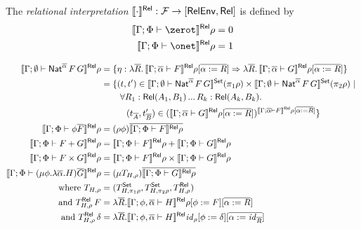 \documentclass{lmcs}
\theoremstyle{plain}\newtheorem{satz}[thm]{Satz}
\newcommand{\F}{\mathcal{F}}
\newcommand{\set}{\mathsf{Set}}
\renewcommand{\id}{\mathit{id}}
\begin{document}
\begin{defi}\label{def:rel-sem}
The {\em relational interpretation} $\relsem{\cdot} : \F \to [\relenv,
 \rel]$ is defined by
\begin{align*}
  \relsem{\Gamma;\Phi \vdash \zerot}\rho &= 0\\
  \relsem{\Gamma;\Phi \vdash \onet}\rho &= 1\\
  \end{align*}

\vspace*{-0.5in}

\begin{align*}
  \relsem{\Gamma; \emptyset \vdash \Nat^{\ol{\alpha}} \,F\,G}\rho &= \{\eta
  : \lambda \ol{R}.\,\relsem{\Gamma; \ol{\alpha} \vdash
    F}\rho[\ol{\alpha := R}] \Rightarrow \lambda \ol{R}. \,\relsem{
    \Gamma; \ol{\alpha} \vdash G}\rho[\ol{\alpha := R}]\}\\
  &=
  \{(t,t') \in \setsem{\Gamma; \emptyset
    \vdash \Nat^{\ol{\alpha}}
    \,F\,G} (\pi_1 \rho) \times \setsem{ 
    \Gamma;\emptyset
    \vdash \Nat^{\ol{\alpha}} \,F\,G} (\pi_2
  \rho)~|~\\ 
  & \hspace{0.3in} \forall {R_1 : \rel(A_1,B_1)}\,...\,{R_k : \rel(A_k,B_k)}.\\
  & \hspace{0.4in} (t_{\ol{A}},t'_{\ol{B}}) \in
  (\relsem{\Gamma; \ol{\alpha} \vdash G}\rho[\ol{\alpha :=
      R}])^{\relsem{\Gamma;\ol{\alpha}\vdash F}\rho[\ol{\alpha := R}]} \}\\  
  \relsem{\Gamma;\Phi \vdash \phi \ol{F}}\rho &=
  (\rho\phi)\ol{\relsem{\Gamma;\Phi \vdash 
    F}\rho}\\
  \relsem{\Gamma;\Phi \vdash F+G}\rho &=
  \relsem{\Gamma;\Phi \vdash F}\rho +
  \relsem{\Gamma;\Phi \vdash G}\rho\\
  \relsem{\Gamma;\Phi \vdash F\times G}\rho &=
  \relsem{\Gamma;\Phi \vdash F}\rho \times
  \relsem{\Gamma;\Phi \vdash G}\rho\\  
   \relsem{\Gamma;\Phi \vdash (\mu \phi.\lambda
    \ol{\alpha}. H)\ol{G}}\rho
  &= (\mu T_{H,\rho})\ol{\relsem{\Gamma;\Phi \vdash G}\rho}\\
  \text{where }	T_{H,\rho}
    &= (T^\set_{H,\pi_1\rho}, T^\set_{H,\pi_2\rho}, T^\rel_{H,\rho}) \\
  \text{and } T^\rel_{H,\rho}\,F
    &= \lambda \ol{R}. \relsem{
      \Gamma;\phi,\ol{\alpha} \vdash H}\rho[\phi :=
    F][\ol{\alpha := R}]\\
  \text{and } T^\rel_{H,\rho}\,\delta
    &= \lambda \ol{R}. \relsem{
      \Gamma;\phi,\ol{\alpha} \vdash H}\id_\rho[\phi :=
    \delta][\ol{\alpha := \id_{\ol{R}}}]
\end{align*}
\end{defi}
\end{document}
